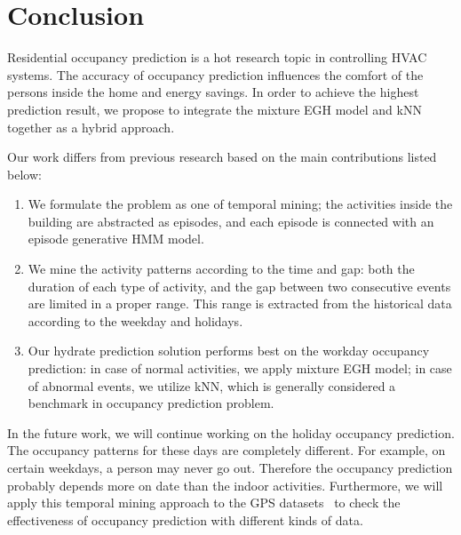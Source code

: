 \section{Conclusion}
Residential occupancy prediction is a hot research topic in controlling HVAC systems. 
The accuracy of occupancy prediction influences the comfort of the persons inside 
the home and energy savings. 
In order to achieve the highest prediction result, 
we propose to integrate the mixture EGH model and 
kNN together as a hybrid approach.

Our work differs from previous research based on the main contributions listed below:
\begin{enumerate}
\item We formulate the problem as one of temporal mining; the activities inside the building are abstracted as episodes, and each episode is connected with an episode generative HMM model.
\item We mine the activity patterns according to the time and gap: both the duration of each type of 
activity, and the gap between two consecutive events are limited in a proper range. 
This range is extracted from the historical data according to the weekday and holidays.
\item Our hydrate prediction solution performs best on the workday occupancy prediction: 
in case of normal activities, we apply mixture EGH model; 
in case of abnormal events, we utilize kNN,  
which is generally considered a benchmark in occupancy prediction problem. 
\end{enumerate}

In the future work, we will continue working on the holiday occupancy prediction. 
The occupancy patterns for these days are completely different. 
For example, on certain weekdays, a person may never go out. 
Therefore the occupancy prediction probably depends more on date than the indoor activities. 
Furthermore, we will apply this temporal mining approach to the GPS datasets~\cite{koehler2013therml}
to check the effectiveness of occupancy prediction with different kinds of data. 